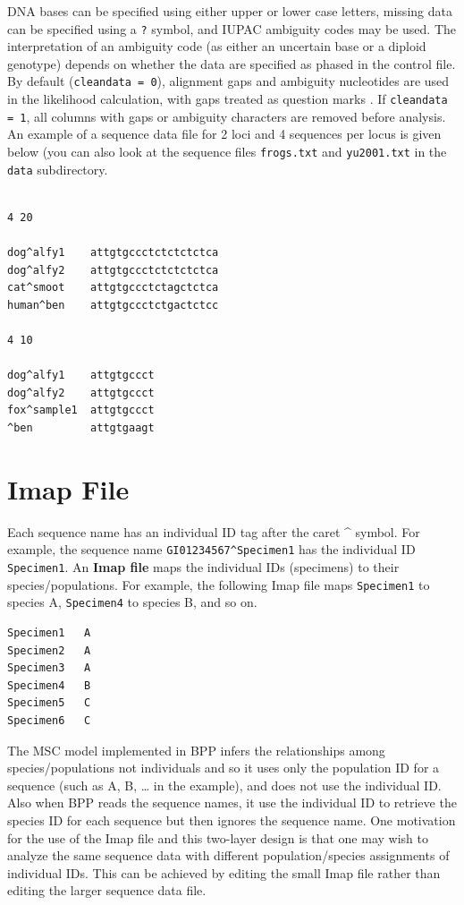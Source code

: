 \documentclass{book}
\numberwithin{equation}{section} \renewcommand{\baselinestretch}{0.55}
\begin{document}
DNA bases can be specified using either upper or lower case
letters, missing data can be specified using a \texttt{?} symbol,
and IUPAC ambiguity codes may be used. The interpretation of an
ambiguity code (as either an uncertain base or a diploid genotype)
depends on whether the data are specified as phased in the control
file.  By default (\texttt{cleandata = 0}), alignment gaps and
ambiguity nucleotides are used in the likelihood calculation, with
gaps treated as question marks
\citep[see][pp.~111-112]{Yang2014b}.  If \texttt{cleandata = 1},
all columns with gaps or ambiguity characters are removed before
analysis. An example of a sequence data file for 2 loci and 4
sequences per locus is given below (you can also look at the
sequence files \texttt{frogs.txt} and \texttt{yu2001.txt} in the
\texttt{data} subdirectory.
\begin{verbatim}

4 20

dog^alfy1    attgtgccctctctctctca
dog^alfy2    attgtgccctctctctctca
cat^smoot    attgtgccctctagctctca
human^ben    attgtgccctctgactctcc

4 10

dog^alfy1    attgtgccct
dog^alfy2    attgtgccct
fox^sample1  attgtgccct
^ben         attgtgaagt

\end{verbatim}

\section{Imap File} \label{imapfile} Each sequence name has an
individual ID tag after the caret \^{} symbol. For example, the
sequence name \texttt{GI01234567\^{}Specimen1} has the individual
ID \texttt{Specimen1}.  An \textbf{Imap file} maps the individual IDs
(specimens) to their species/populations.  For example, the
following Imap file maps \texttt{Specimen1} to species A, \texttt{Specimen4}
to species B, and so on.
\begin{verbatim}
Specimen1   A
Specimen2   A
Specimen3   A
Specimen4   B
Specimen5   C
Specimen6   C
\end{verbatim}
    The MSC model implemented in \textsc{BPP} infers the relationships
    among species/populations not individuals and so it uses only the
    population ID for a sequence (such as A, B, … in the example), and
    does not use the individual ID.  Also when \textsc{BPP} reads the
    sequence names, it use the individual ID to retrieve the species
    ID for each sequence but then ignores the sequence name.  One
    motivation for the use of the Imap file and this two-layer design
    is that one may wish to analyze the same sequence data with
    different population/species assignments of individual IDs. This
    can be achieved by editing the small Imap file rather than editing
    the larger sequence data file.
\end{document}
